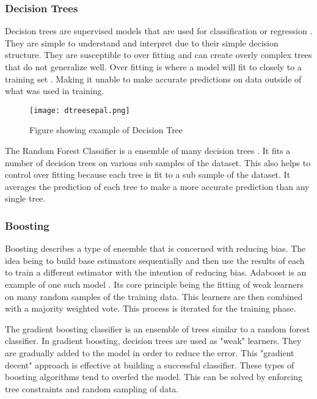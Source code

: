 \subsubsection{Decision Trees}
Decision trees are supervised models that are used for classification or regression \cite{breiman2017classification}.
They are simple to understand and interpret due to their simple decision structure. 
They are susceptible to over fitting and can create overly complex trees that do not generalize well.
Over fitting is where a model will fit to closely to a training set \cite{cawley2010over}. 
Making it unable to make accurate predictions on data outside of what was used in training.

\begin{figure}[h]
    \centering
    \texttt{[image: dtreesepal.png]}
    \caption{Figure showing example of Decision Tree}
    \label{}
\end{figure}

\par
The Random Forest Classifier is a ensemble of many decision trees \cite{breiman2001random}.
It fits a number of decision trees on various sub samples of the dataset.
This also helps to control over fitting because each tree is fit to a sub sample of the dataset.
It averages the prediction of each tree to make a more accurate prediction than any single tree.


\subsubsection{Boosting}
Boosting describes a type of ensemble that is concerned with reducing bias.
The idea being to build base estimators sequentially and then use the results of each to train a different estimator with the intention of reducing bias.
Adaboost is an example of one such model \cite{freund1995desicion}.
Its core principle being the fitting of weak learners on many random samples of the training data.
This learners are then combined with a majority weighted vote. 
This process is iterated for the training phase.



\par
The gradient boosting classifier is an ensemble of trees similar to a random forest classifier.
In gradient boosting, decision trees are used as "weak" learners.
They are gradually added to the model in order to reduce the error.
This "gradient decent" approach is effective at building a successful classifier.
These types of boosting algorithms tend to overfed the model.
This can be solved by enforcing tree constraints and random sampling of data.


